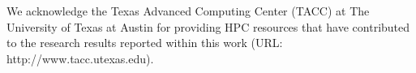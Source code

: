 \documentclass{article}
\begin{document}
We acknowledge the Texas Advanced Computing Center (TACC) at The University of Texas at Austin for providing 
HPC resources that have contributed to the research results reported within this work (URL: http://www.tacc.utexas.edu).




\end{document}
